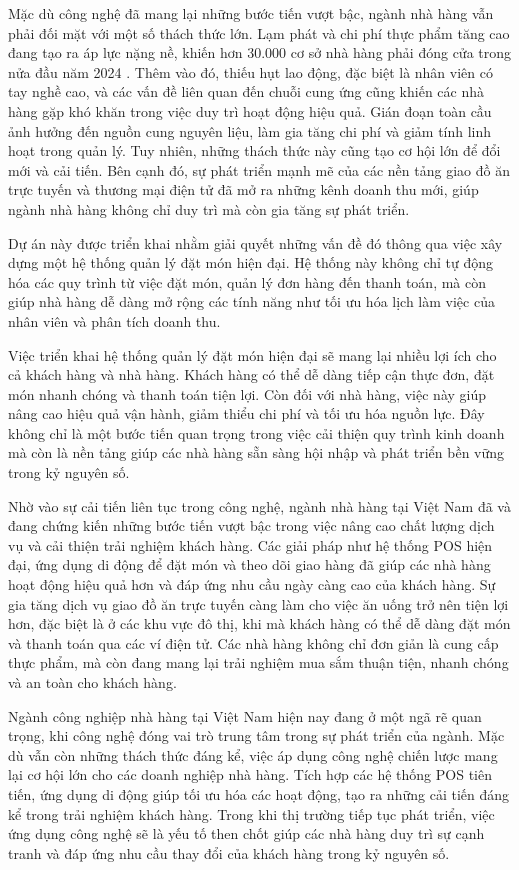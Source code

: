 Mặc dù công nghệ đã mang lại những bước tiến vượt bậc, ngành nhà hàng vẫn phải đối mặt với một số thách thức lớn. Lạm phát và chi phí thực phẩm tăng cao đang tạo ra áp lực nặng nề, khiến hơn 30.000 cơ sở nhà hàng phải đóng cửa trong nửa đầu năm 2024 \cite{USDA}. Thêm vào đó, thiếu hụt lao động, đặc biệt là nhân viên có tay nghề cao, và các vấn đề liên quan đến chuỗi cung ứng cũng khiến các nhà hàng gặp khó khăn trong việc duy trì hoạt động hiệu quả. Gián đoạn toàn cầu ảnh hưởng đến nguồn cung nguyên liệu, làm gia tăng chi phí và giảm tính linh hoạt trong quản lý. Tuy nhiên, những thách thức này cũng tạo cơ hội lớn để đổi mới và cải tiến. Bên cạnh đó, sự phát triển mạnh mẽ của các nền tảng giao đồ ăn trực tuyến và thương mại điện tử đã mở ra những kênh doanh thu mới, giúp ngành nhà hàng không chỉ duy trì mà còn gia tăng sự phát triển.

Dự án này được triển khai nhằm giải quyết những vấn đề đó thông qua việc xây dựng một hệ thống quản lý đặt món hiện đại. Hệ thống này không chỉ tự động hóa các quy trình từ việc đặt món, quản lý đơn hàng đến thanh toán, mà còn giúp nhà hàng dễ dàng mở rộng các tính năng như tối ưu hóa lịch làm việc của nhân viên và phân tích doanh thu.

Việc triển khai hệ thống quản lý đặt món hiện đại sẽ mang lại nhiều lợi ích cho cả khách hàng và nhà hàng. Khách hàng có thể dễ dàng tiếp cận thực đơn, đặt món nhanh chóng và thanh toán tiện lợi. Còn đối với nhà hàng, việc này giúp nâng cao hiệu quả vận hành, giảm thiểu chi phí và tối ưu hóa nguồn lực. Đây không chỉ là một bước tiến quan trọng trong việc cải thiện quy trình kinh doanh mà còn là nền tảng giúp các nhà hàng sẵn sàng hội nhập và phát triển bền vững trong kỷ nguyên số.

Nhờ vào sự cải tiến liên tục trong công nghệ, ngành nhà hàng tại Việt Nam đã và đang chứng kiến những bước tiến vượt bậc trong việc nâng cao chất lượng dịch vụ và cải thiện trải nghiệm khách hàng. Các giải pháp như hệ thống POS hiện đại, ứng dụng di động để đặt món và theo dõi giao hàng đã giúp các nhà hàng hoạt động hiệu quả hơn và đáp ứng nhu cầu ngày càng cao của khách hàng. Sự gia tăng dịch vụ giao đồ ăn trực tuyến càng làm cho việc ăn uống trở nên tiện lợi hơn, đặc biệt là ở các khu vực đô thị, khi mà khách hàng có thể dễ dàng đặt món và thanh toán qua các ví điện tử. Các nhà hàng không chỉ đơn giản là cung cấp thực phẩm, mà còn đang mang lại trải nghiệm mua sắm thuận tiện, nhanh chóng và an toàn cho khách hàng.

Ngành công nghiệp nhà hàng tại Việt Nam hiện nay đang ở một ngã rẽ quan trọng, khi công nghệ đóng vai trò trung tâm trong sự phát triển của ngành. Mặc dù vẫn còn những thách thức đáng kể, việc áp dụng công nghệ chiến lược mang lại cơ hội lớn cho các doanh nghiệp nhà hàng. Tích hợp các hệ thống POS tiên tiến, ứng dụng di động giúp tối ưu hóa các hoạt động, tạo ra những cải tiến đáng kể trong trải nghiệm khách hàng. Trong khi thị trường tiếp tục phát triển, việc ứng dụng công nghệ sẽ là yếu tố then chốt giúp các nhà hàng duy trì sự cạnh tranh và đáp ứng nhu cầu thay đổi của khách hàng trong kỷ nguyên số.